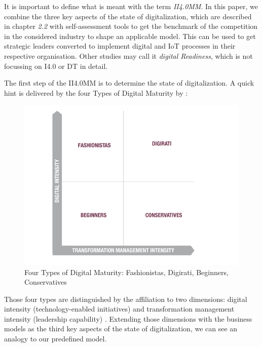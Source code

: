 It is important to define what is meant with the term \emph{\ac{II4.0MM}}. In this paper, we combine the three key aspects of the state of digitalization, which are described in chapter \emph{2.2} %
with self-assessment tools to get the benchmark of the competition in the considered industry to shape an applicable model. This can be used to get strategic leaders converted to implement digital and \ac{IoT} processes in their respective organisation.
Other studies may call it \emph{digital Readiness}, which is not focussing on \ac{I4.0} or \ac{DT} in detail.

The first step of the \ac{II4.0MM} is to determine the state of digitalization. A quick hint is delivered by the four Types of Digital Maturity by \cite[p.4]{CapgeminiMaturityModelDigitalAdvantage}:

\begin{figure}[H]
\centering
\includegraphics[width=1\columnwidth]{images/maturityModel_4segments_capgemini.PNG}
\caption{Four Types of Digital Maturity: Fashionistas, Digirati, Beginners, Conservatives \cite{CapgeminiMaturityModelDigitalAdvantage}}
\end{figure}

Those four types are distinguished by the affiliation to two dimensions: digital intensity (technology-enabled initiatives) and transformation management intensity (leadership capability) \cite{CapgeminiMaturityModelDigitalAdvantage}. Extending those dimensions with the business models as the third key aspects of the state of digitalization, we can see an analogy to our predefined model.

